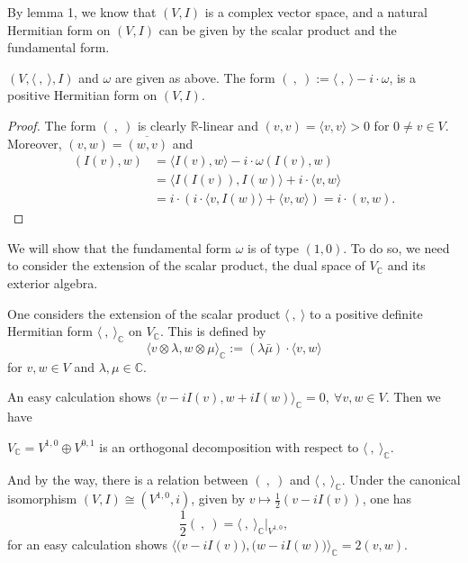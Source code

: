 \documentclass{ctexart}
\begin{document}
By lemma 1, we know that $(V,I)$ is a complex vector space, and a natural Hermitian form on $(V,I)$ can be given by the scalar product and the fundamental form. 
\begin{lemma}
  $(V,\langle\ ,\ \rangle, I)$ and $\omega$ are given as above. The form $(\ ,\ ):=\langle\ ,\ \rangle-i \cdot \omega$, 
  is a positive Hermitian form on $(V, I)$.
\end{lemma}
\begin{proof}[Proof]
  The form $(\ ,\ )$ is clearly $\mathbb{R}$-linear and $(v, v)=\langle v, v\rangle>0$ for $0 \neq v \in V$.
  Moreover, $(v, w)=\overline{(w, v)}$ and
  $$
  \begin{aligned}
  (I(v), w) &=\langle I(v), w\rangle-i \cdot \omega(I(v), w) \\
  &=\langle I(I(v)), I(w)\rangle+i \cdot\langle v, w\rangle \\
  &=i \cdot(i \cdot\langle v, I(w)\rangle+\langle v, w\rangle)=i \cdot(v, w) .
  \end{aligned}
  $$
\end{proof}

We will show that the fundamental form $\omega$ is of type $(1,0)$. To do so, we need to consider the extension of the scalar product, 
the dual space of $V_\mathbb{C}$ and its exterior algebra. 

One considers the extension of the scalar product $\langle\ ,\ \rangle$ to a positive definite Hermitian form $\langle\ ,\ \rangle_{\mathbb{C}}$ on $V_{\mathbb{C}}$. 
This is defined by
$$
\langle v \otimes \lambda, w \otimes \mu\rangle_{\mathbb{C}}:=(\lambda \bar{\mu}) \cdot\langle v, w\rangle
$$
for $v, w \in V$ and $\lambda, \mu \in \mathbb{C}$.

An easy calculation shows $\langle v-i I(v), w+i I(w)\rangle_{\mathbb{C}}=0,\ \forall v,w\in V$. Then we have
\begin{lemma}
  $V_{\mathbb{C}}=V^{1,0} \oplus V^{0,1}$ is an orthogonal decomposition with respect to $\langle\ ,\ \rangle_{\mathbb{C}}$. 
\end{lemma}

And by the way, there is a relation between $(\ ,\ )$ and $\langle\ ,\ \rangle_{\mathbb{C}}$. Under the canonical isomorphism $(V, I) \cong(V^{1,0}, i)$, given by $v \mapsto \frac{1}{2}(v-i I(v))$, 
one has 
$$
\frac{1}{2}(\ ,\ )=\langle\ ,\ \rangle_{\mathbb{C}}\big|_{V^{1,0}},
$$ 
for an easy calculation shows $\langle\big(v-i I(v)\big),\big(w-i I(w)\big)\rangle_{\mathbb{C}}=2\left(v, w\right)$. 
\end{document}
